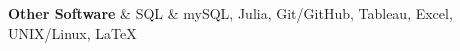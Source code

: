 \textbf{Other Software} & 
SQL \& mySQL, 
Julia, 
Git/GitHub, 
Tableau, 
Excel, 
UNIX/Linux, 
\LaTeX
